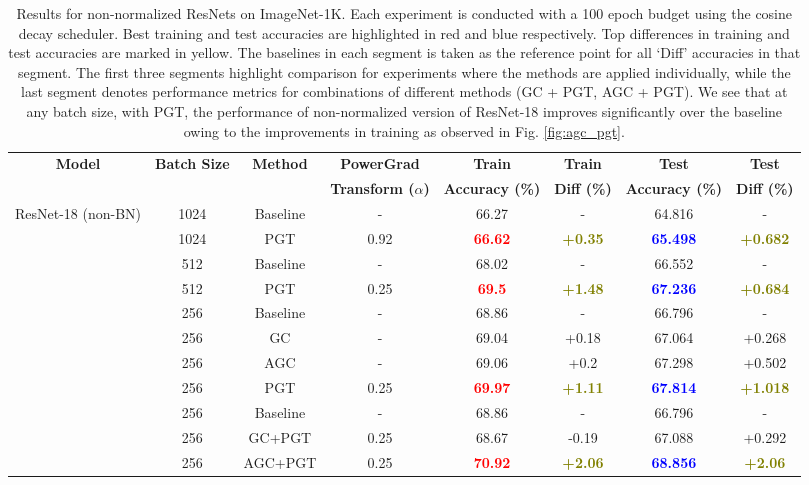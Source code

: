 \documentclass[times,sort&compress]{elsarticle}
\begin{document}
\begin{table}[!t]
\centering
\caption{ Results for non-normalized ResNets on ImageNet-1K. Each experiment is
conducted with a 100 epoch budget using the cosine decay scheduler. Best training and
test accuracies are highlighted in red and blue respectively. Top differences in
training and test accuracies are marked in yellow. The baselines in each segment is
taken as the reference point for all `Diff' accuracies in that segment. The first three
segments highlight comparison for experiments where the methods are applied
individually, while the last segment denotes performance metrics for combinations of
different methods (GC + PGT, AGC + PGT). We see that at any batch size, with PGT, the
performance of non-normalized version of ResNet-18 improves significantly over the
baseline owing to the improvements in training as observed in Fig. \ref{fig:agc_pgt}. }
\label{tab:wobn_table}
\begin{tabular}{cccccccc}
\multirow{2}{*}{\textbf{Model}} & \multirow{2}{*}{\textbf{Batch Size}} &
\multirow{2}{*}{\textbf{Method}} & \textbf{PowerGrad} & \textbf{\hspace{-0.65cm} Train}
& \textbf{Train} & \textbf{\hspace{-0.65cm} Test} & \textbf{Test} \\
& & & \textbf{Transform ($\alpha$)} & \textbf{Accuracy (\%)} & \textbf{Diff (\%)} &
\textbf{Accuracy (\%)} & \textbf{Diff (\%)} \\
\midrule
ResNet-18 (non-BN) & 1024 & Baseline & - & 66.27 & - & 64.816 & - \\
& 1024 & PGT & 0.92 & \textcolor{red}{\textbf{66.62}} &
\textcolor{olive}{\textbf{+0.35}} & \textcolor{blue}{\textbf{65.498}} &
\textcolor{olive}{\textbf{+0.682}} \\
\cmidrule{2-8}
& 512 & Baseline & - & 68.02 & - & 66.552 & - \\
& 512 & PGT & 0.25 & \textcolor{red}{\textbf{69.5}} & \textcolor{olive}{\textbf{+1.48}}
& \textcolor{blue}{\textbf{67.236}} & \textcolor{olive}{\textbf{+0.684}} \\
\cmidrule{2-8}
& 256 & Baseline & - & 68.86 & - & 66.796 & - \\
& 256 & GC & - & 69.04 & +0.18 & 67.064 & +0.268 \\
& 256 & AGC & - & 69.06 & +0.2 & 67.298 & +0.502 \\
& 256 & PGT & 0.25 & \textcolor{red}{\textbf{69.97}} & \textcolor{olive}{\textbf{+1.11}}
& \textcolor{blue}{\textbf{67.814}} & \textcolor{olive}{\textbf{+1.018}} \\
\cmidrule{2-8}
& 256 & Baseline & - & 68.86 & - & 66.796 & - \\
& 256 & GC+PGT & 0.25 & 68.67 & -0.19 & 67.088 & +0.292 \\
& 256 & AGC+PGT & 0.25 & \textcolor{red}{\textbf{70.92}} &
\textcolor{olive}{\textbf{+2.06}} & \textcolor{blue}{\textbf{68.856}} &
\textcolor{olive}{\textbf{+2.06}} \\
\end{tabular}
\end{table}
\end{document}
